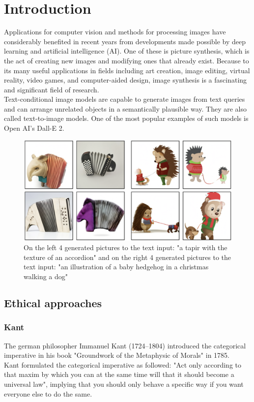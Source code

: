 \documentclass[11pt]{article}
\begin{document}
\section{Introduction}
Applications for computer vision and methods for processing images have considerably benefited in recent years from developments made possible by deep learning and artificial intelligence (AI). One of these is picture synthesis, which is the act of creating new images and modifying ones that already exist. Because to its many useful applications in fields including art creation, image editing, virtual reality, video games, and computer-aided design, image synthesis is a fascinating and significant field of research.\\
Text-conditional image models are capable to generate images from text queries and can arrange unrelated objects in a semantically plausible way. They are also called text-to-image models.
One of the most popular examples of such models is Open AI's Dall-E 2.

\begin{figure} [h]
	\includegraphics[width = 1\linewidth]{images/DallEExample.png}
	\caption{On the left 4 generated pictures to the text input: "a tapir with the texture of an accordion" and on the right 4 generated pictures to the text input: "an illustration of a baby hedgehog in a christmas walking a dog" \cite{zeroShot}}
	\label{example}
\end{figure}

\subsection{Ethical approaches}

\subsubsection{Kant}
The german philosopher Immanuel Kant (1724--1804) introduced the categorical imperative in his book "Groundwork of the Metaphysic of Morals" in 1785. \\
Kant formulated the categorical imperative as followed: "Act only according to that maxim by which you can at the same time will that it should become a universal law", implying that you should only behave a specific way if you want everyone else to do the same.
\end{document}
